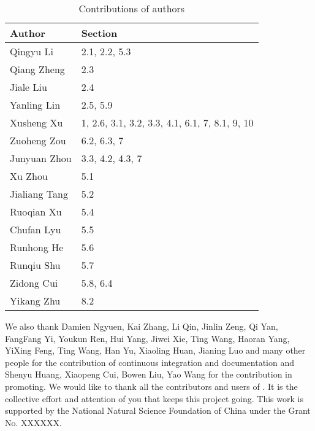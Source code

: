 \documentclass[pra,twocolumn,superscriptaddress,floatfix,nofootinbib,amsmath,amssymb]{revtex4-1}
\numberwithin{equation}{section}
\numberwithin{figure}{section}
\numberwithin{table}{section}
\begin{document}
\begin{table}[ht]
    \begin{tabular}{|p{3cm}|p{3cm}|}
        \toprule
        Author        & Section                                        \\
        \midrule
        Qingyu Li     & 2.1, 2.2, 5.3                                  \\
        Qiang Zheng   & 2.3                                            \\
        Jiale Liu     & 2.4                                            \\
        Yanling Lin   & 2.5, 5.9                                       \\
        Xusheng Xu    & 1, 2.6, 3.1, 3.2, 3.3, 4.1, 6.1, 7, 8.1, 9, 10 \\
        Zuoheng Zou   & 6.2, 6.3, 7                                    \\
        Junyuan Zhou  & 3.3, 4.2, 4.3, 7                               \\
        Xu Zhou       & 5.1                                            \\
        Jialiang Tang & 5.2                                            \\
        Ruoqian Xu    & 5.4                                            \\
        Chufan Lyu    & 5.5                                            \\
        Runhong He    & 5.6                                            \\
        Runqiu Shu    & 5.7                                            \\
        Zidong Cui    & 5.8, 6.4                                       \\
        Yikang Zhu    & 8.2                                            \\
        \bottomrule
    \end{tabular}
    \caption{Contributions of authors}
    \label{tab:contributions}
\end{table}

We also thank Damien Ngyuen, Kai Zhang, Li Qin, Jinlin Zeng, Qi Yan, FangFang Yi, Youkun Ren, Hui Yang, Jiwei Xie, Ting Wang, Haoran Yang, YiXing Feng, Ting Wang, Han Yu, Xiaoling Huan, Jianing Luo and many other people for the contribution of continuous integration and documentation and Shenyu Huang, Xiaopeng Cui, Bowen Liu, Yao Wang for the contribution in promoting. We would like to thank all the contributors and users of \MindQuantum. It is the collective effort and attention of you that keeps this project going.
This work is supported by the National Natural Science Foundation of China under the Grant No. XXXXXX.

\end{document}
